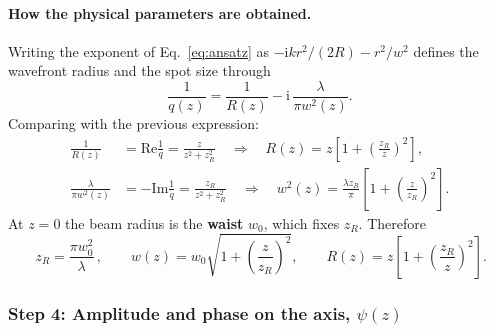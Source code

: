 \documentclass[11pt,a4paper]{article}
\begin{document}
	\paragraph{How the physical parameters are obtained.} Writing the exponent of Eq.~\eqref{eq:ansatz} as $-\mathrm{i}kr^2/(2R)-r^2/w^2$ defines the wavefront radius and the spot size through
	\begin{equation}
		\frac{1}{q(z)}=\frac{1}{R(z)}-\mathrm{i}\,\frac{\lambda}{\pi w^2(z)} .
	\end{equation}
	Comparing with the previous expression:
	\begin{align}
		\frac{1}{R(z)}&=\mathrm{Re}\frac{1}{q}=\frac{z}{z^2+z_R^2}\quad\Longrightarrow\quad R(z)=z\left[1+\left(\frac{z_R}{z}\right)^2\right],\\
		\frac{\lambda}{\pi w^2(z)}&=-\mathrm{Im}\frac{1}{q}=\frac{z_R}{z^2+z_R^2}\quad\Longrightarrow\quad w^2(z)=\frac{\lambda z_R}{\pi}\left[1+\left(\frac{z}{z_R}\right)^2\right].
	\end{align}
	At $z=0$ the beam radius is the \textbf{waist} $w_0$, which fixes $z_R$. Therefore
	\begin{equation}
		\boxed{\,z_R=\frac{\pi w_0^2}{\lambda}\,},\qquad
		w(z)=w_0\sqrt{1+\left(\frac{z}{z_R}\right)^2},\qquad
		R(z)=z\left[1+\left(\frac{z_R}{z}\right)^2\right].
		\label{eq:gaussw}
	\end{equation}
	
	\subsubsection*{Step 4: Amplitude and phase on the axis, $\psi(z)$}
	
\end{document}
